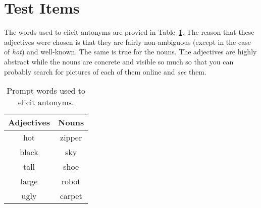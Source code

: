 \section{Test Items}
The words used to elicit antonyms are provied in Table~\ref{tab:key-words}.  The reason that these adjectives were chosen is that they are fairly non-ambiguous (except in the case of \textit{hot}) and well-known.  The same is true for the nouns.  The adjectives are highly abstract while the nouns are concrete and visible so much so that you can probably search for pictures of each of them online and \textit{see} them.   

\begin{table}
	\begin{center}
		\begin{tabular}{|c|c|}	\hline
			\textbf{Adjectives} & \textbf{Nouns} 	\\ \hline
			hot					&  zipper 			\\ \hline
			black				&  sky				\\ \hline
			tall				&  shoe				\\ \hline
			large				&  robot			\\ \hline
			ugly				&  carpet			\\ \hline
		\end{tabular}
	\end{center}
	\caption{Prompt words used to elicit antonyms.}
	\label{tab:key-words}
\end{table}
